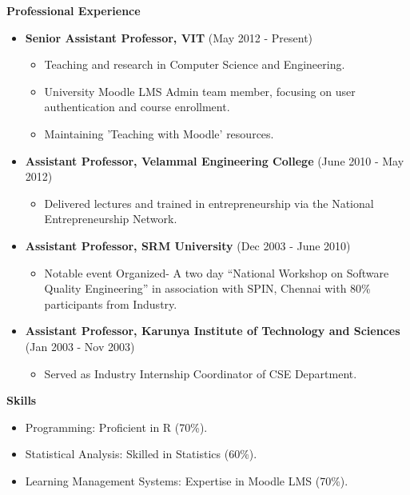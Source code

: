 \documentclass[a4paper,10pt]{article}
\newcommand{\cvsection}[1]{%
    \vspace{2mm}
    \begin{tcolorbox}
        \textbf{\large #1}
    \end{tcolorbox}
    \vspace{-4mm}
}
\begin{document}
\cvsection{Professional Experience}
\begin{itemize}[leftmargin=*]
    \item \textbf{Senior Assistant Professor, VIT} (May 2012 - Present)
        \begin{itemize}[leftmargin=*]
            \item Teaching and research in Computer Science and Engineering.
            \item University Moodle LMS Admin team member, focusing on user authentication and course enrollment.
            \item Maintaining 'Teaching with Moodle' resources.
        \end{itemize}
    \item \textbf{Assistant Professor, Velammal Engineering College} (June 2010 - May 2012)
        \begin{itemize}[leftmargin=*]
            \item Delivered lectures and trained in entrepreneurship via the National Entrepreneurship Network.
        \end{itemize}
        \item \textbf{Assistant Professor, SRM University} (Dec 2003 - June 2010)
        \begin{itemize}[leftmargin=*]
        	\item Notable event Organized- A two day “National Workshop on Software Quality Engineering” in association with SPIN, Chennai with 80\% participants from Industry.
        \end{itemize}
        \item \textbf{Assistant Professor, Karunya Institute of Technology and Sciences} (Jan 2003 - Nov 2003)
        \begin{itemize}[leftmargin=*]
        	\item Served as Industry Internship Coordinator of CSE Department.
        \end{itemize}
\end{itemize}

\cvsection{Skills}
\begin{itemize}[leftmargin=*]
    \item Programming: Proficient in R (70\%).
    \item Statistical Analysis: Skilled in Statistics (60\%).
    \item Learning Management Systems: Expertise in Moodle LMS (70\%).
\end{itemize}
\end{document}

